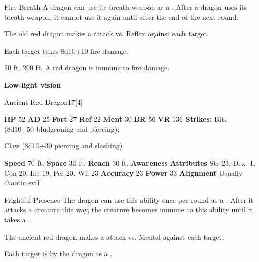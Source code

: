     \begin{freeability}{Fire Breath}
      A dragon can use its breath weapon as a .
      After a dragon uses its breath weapon, it cannot use it again until after the end of the next round.
      \par The old red dragon makes a  attack
        vs. Reflex against each target.
    
    \hit Each target takes 8d10+10 fire damage.
    \end{freeability}
  
      
       50 ft.
     200 ft.
     A red dragon is immune to fire damage.
    \par\noindent\textbf{Low-light vision}
  

  \begin{monsubsection}{Ancient Red Dragon}{17}[4]
    \vspace{-1em}\vspace{-1em}
    \vspace{0em}

    
    

    \begin{spellcontent}
      \begin{spelltargetinginfo}
        \pari \textbf{HP} 52 \monsep
          \textbf{AD} 25 \monsep
          \textbf{Fort} 27 \monsep
          \textbf{Ref} 22 \monsep
          \textbf{Ment} 30
        \pari \textbf{BR} 56 \monsep
        \textbf{VR} 136
        \pari \textbf{Strikes:}
            Bite  (8d10+50 bludgeoning and piercing);
\par Claw  (8d10+30 piercing and slashing)
      \end{spelltargetinginfo}
    \end{spellcontent}
    \begin{monsterfooter}
      \pari \textbf{Speed} 70 ft. \monsep
        \textbf{Space} 30 ft. \monsep
        \textbf{Reach} 30 ft.
      \pari \textbf{Awareness} 
      \pari \textbf{Attributes}
        Str 23, Dex -1,
        Con 20, Int 19,
        Per 20, Wil 23
      \pari \textbf{Accuracy} 23 \monsep
        \textbf{Power} 33
      \pari \textbf{Alignment} Usually chaotic evil
    \end{monsterfooter}
  \end{monsubsection}
  \begin{freeability}{Frightful Presence}
      The dragon can use this ability once per round as a .
      After it attacks a creature this way, the creature becomes immune to this ability until it takes a .
      \par The ancient red dragon makes a  attack
        vs. Mental against each target.
    
    \hit Each target is  by the dragon as a .
    \end{freeability}
  

